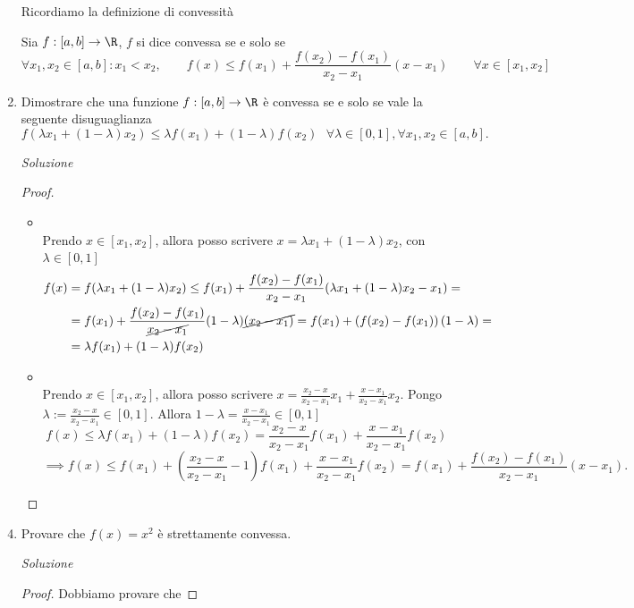 \documentclass{article}
\begin{document}
\begin{enumerate}[label=\textbf{Esercizio 12.\arabic*.},itemindent=*]
Ricordiamo la definizione di convessità
\begin{shaded}
    \begin{definition}[Convessità]
        Sia $f:[a,b]\to\R$, $f$ si dice convessa se e solo se
        \[\forall x_1,x_2\in [a,b]:x_1 < x_2,\qquad f(x)\leq f(x_1)+\frac{f(x_2)-f(x_1)}{x_2-x_1}(x - x_1)\qquad \forall x\in[x_1,x_2] \]
    \end{definition}
\end{shaded}
\item Dimostrare che una funzione $f:[a,b]\to\R$ è convessa se e solo se vale la seguente disuguaglianza
\[f(\lambda x_1+(1-\lambda)x_2)\leq \lambda f(x_1)+(1-\lambda)f(x_2)~~~\forall \lambda \in [0,1], \forall x_1,x_2\in [a,b].\]
\item[\textit{\large Soluzione~}]~
\begin{proof}~
    \begin{itemize}
        \item \say{$\Rightarrow$}\\
        Prendo $x \in [x_1,x_2]$, allora posso scrivere $x=\lambda x_1+(1-\lambda)x_2$, con $\lambda\in[0,1]$
        \[\begin{aligned}f(x)&=f(\lambda x_1+(1-\lambda)x_2)\leq f(x_1) +\frac{f(x_2)-f(x_1)}{x_2-x_1}(\lambda x_1 +(1-\lambda )x_2-x_1) =\\
        &=f(x_1) +\frac{f(x_2)-f(x_1)}{\cancel{x_2-x_1}}(1-\lambda)\cancel{(x_2-x_1)} = f(x_1) + \left( f(x_2) - f(x_1) \right)(1 -\lambda) =\\&= \lambda f(x_1)+(1-\lambda)f(x_2)\end{aligned}\]
        \item \say{$\Leftarrow$}\\Prendo $x \in [x_1,x_2]$, allora posso scrivere $x=\frac{x_2-x}{x_2-x_1}x_1+\frac{x-x_1}{x_2-x_1}x_2$. Pongo $\lambda:=\frac{x_2-x}{x_2-x_1}\in[0,1]$. Allora $1-\lambda=\frac{x-x_1}{x_2-x_1}\in [0,1]$
        \[f(x)\leq \lambda f(x_1)+(1-\lambda)f(x_2)=\frac{x_2-x}{x_2-x_1}f(x_1)+\frac{x-x_1}{x_2-x_1}f(x_2)\]
        \[\implies f(x)\leq f(x_1) + (\frac{x_2-x}{x_2-x_1}-1)f(x_1)+\frac{x-x_1}{x_2-x_1}f(x_2) = f(x_1) +\frac{f(x_2) - f(x_1)}{x_2 - x_1}(x - x_1).\]
    \end{itemize}
\end{proof}
\item Provare che $f(x)=x^2$ è strettamente convessa.
\item[\textit{\large Soluzione~}]~
\begin{proof} Dobbiamo provare che

\end{proof}
\end{enumerate}
\end{document}
